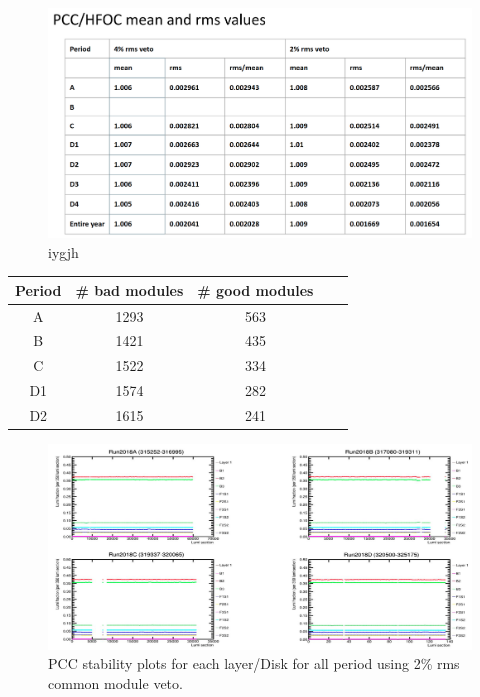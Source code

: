     
\begin{figure}[!htp]
\centering
\includegraphics[width=1\textwidth]{ashish_thesis/pcc_hfoc_4_2_rms_mean.png}
\caption{%
  iygjh
}
\label{fig:twoper common veto pcc hfoc rms mean}
\end{figure}

\begin{table}[!ht]
\centering
{}
\begin{tabular}{ccccc}
    \textbf{Period} & \textbf{# bad modules} & \textbf{# good modules} \\ \hline
    A & 1293 & 563  \\
    B & 1421  & 435  \\
    C & 1522  & 334 \\
    D1 & 1574  & 282  \\
   D2  & 1615  & 241 \\
\end{tabular}
\label{tab:pccvis_diffveto}
\end{table}







\begin{figure}[!htp]
\centering
\includegraphics[width=1\textwidth]{ashish_thesis/pcc_layer_disk_stability_2per_veto.png}
\caption{%
PCC stability plots for each layer/Disk for all period using 2\% rms common module veto.
}
\label{fig:pcclayerdisktwopercommonveto}
\end{figure}

